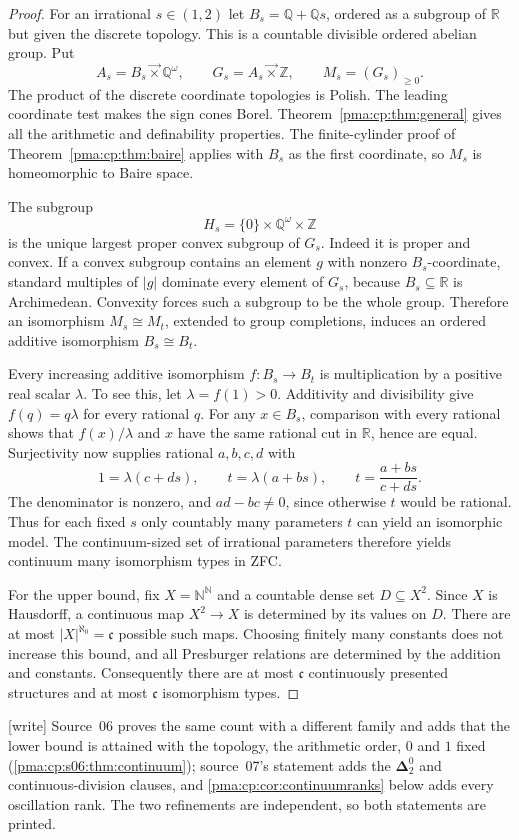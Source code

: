 \documentclass[11pt]{article}
\numberwithin{equation}{section}
\theoremstyle{definition}
\theoremstyle{remark}
\newcommand{\N}{\mathbb N}
\newcommand{\Z}{\mathbb Z}
\newcommand{\Q}{\mathbb Q}
\newcommand{\R}{\mathbb R}
\newcommand{\Baire}{\N^{\N}}
\newcommand{\lex}{\mathbin{\overrightarrow\times}}
\newcommand{\Dtwo}{\boldsymbol{\Delta}^{0}_{2}}
\newcommand{\writetag}{\textup{\textsf{\small[write]}}}
\newcommand{\cp}{\mathfrak c}
\begin{document}
\begin{proof}
For an irrational $s\in(1,2)$ let $B_s=\Q+\Q s$, ordered as a subgroup
of $\R$ but given the discrete topology. This is a countable divisible
ordered abelian group. Put
\[
A_s=B_s\lex\Q^\omega,\qquad
G_s=A_s\lex\Z,\qquad M_s=(G_s)_{\geq0}.
\]
The product of the discrete coordinate topologies is Polish. The leading
coordinate test makes the sign cones Borel. Theorem~\ref{pma:cp:thm:general}
gives all the arithmetic and definability properties. The finite-cylinder
proof of Theorem~\ref{pma:cp:thm:baire} applies with $B_s$ as the first
coordinate, so $M_s$ is homeomorphic to Baire space.

The subgroup
\[
H_s=\{0\}\times\Q^\omega\times\Z
\]
is the unique largest proper convex subgroup of $G_s$. Indeed it is
proper and convex. If a convex subgroup contains an element $g$ with
nonzero $B_s$-coordinate, standard multiples of $|g|$ dominate every
element of $G_s$, because $B_s\subseteq\R$ is Archimedean.
Convexity forces such a subgroup to be the whole group. Therefore an
isomorphism $M_s\cong M_t$, extended to group completions, induces an
ordered additive isomorphism $B_s\cong B_t$.

Every increasing additive isomorphism $f:B_s\to B_t$ is multiplication
by a positive real scalar $\lambda$. To see this, let $\lambda=f(1)>0$.
Additivity and divisibility give $f(q)=q\lambda$ for every rational $q$.
For any $x\in B_s$, comparison with every rational shows that
$f(x)/\lambda$ and $x$ have the same rational cut in $\R$, hence are
equal. Surjectivity now supplies rational $a,b,c,d$ with
\[
1=\lambda(c+ds),\qquad t=\lambda(a+bs),
\qquad
t=\frac{a+bs}{c+ds}.
\]
The denominator is nonzero, and $ad-bc\ne0$, since otherwise $t$ would
be rational. Thus for each fixed $s$ only countably many parameters $t$
can yield an isomorphic model. The continuum-sized set of irrational
parameters therefore yields continuum many isomorphism types in ZFC.

For the upper bound, fix $X=\Baire$ and a countable dense set
$D\subseteq X^2$. Since $X$ is Hausdorff, a continuous map $X^2\to X$
is determined by its values on $D$. There are at most
$|X|^{\aleph_0}=\cp$ possible such maps. Choosing finitely many constants
does not increase this bound, and all Presburger relations are determined
by the addition and constants. Consequently there are at most $\cp$
continuously presented structures and at most $\cp$ isomorphism types.
\end{proof}

\noindent\writetag{} Source~06 proves the same count with a different family
and adds that the lower bound is attained with the topology, the arithmetic
order, $0$ and $1$ fixed (\cref{pma:cp:s06:thm:continuum}); source~07's
statement adds the $\Dtwo$ and continuous-division clauses, and
\cref{pma:cp:cor:continuumranks} below adds every oscillation rank. The two
refinements are independent, so both statements are printed.
\end{document}
